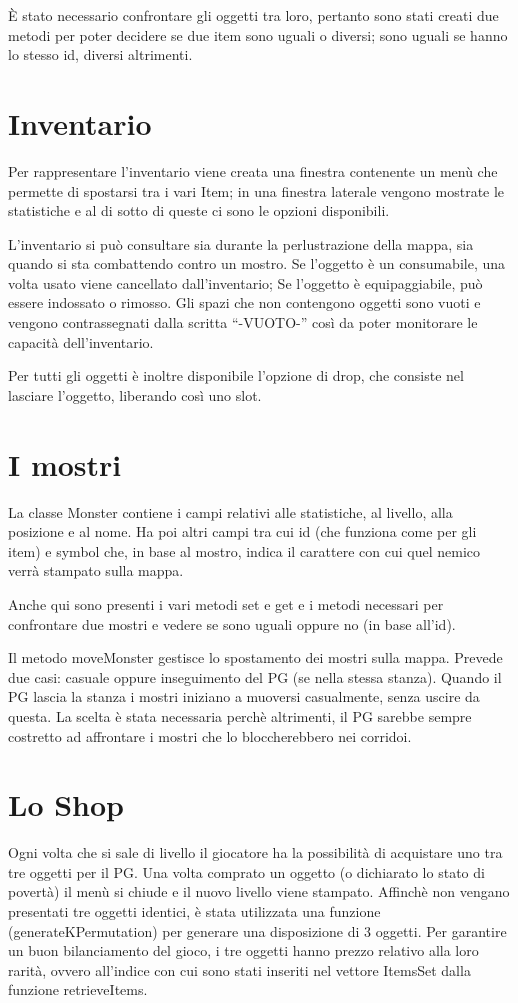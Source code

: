 \documentclass[10pt]{report}
\begin{document}
È stato necessario confrontare gli oggetti tra loro, pertanto sono stati creati due metodi per poter
decidere se due item sono uguali o diversi; sono uguali se hanno lo stesso id, diversi altrimenti.

\section{Inventario}
Per rappresentare l'inventario viene creata una finestra contenente un menù che permette di spostarsi tra i vari Item; in una finestra laterale vengono mostrate le statistiche e al di sotto di queste ci sono le opzioni disponibili.

L'inventario si può consultare sia durante la perlustrazione della mappa, sia quando 
si sta combattendo contro un mostro. 
Se l'oggetto è un consumabile, una volta usato viene cancellato dall'inventario; 
Se l'oggetto è equipaggiabile, può essere indossato o rimosso. Gli spazi che non contengono oggetti sono vuoti e vengono
contrassegnati dalla scritta ``-VUOTO-'' così da poter monitorare le capacità dell'inventario. 

Per tutti gli oggetti è inoltre disponibile l'opzione di drop, che consiste nel lasciare l'oggetto, liberando così uno slot.

\section{I mostri}

La classe Monster contiene i campi relativi alle statistiche, al livello, alla posizione e al nome.
Ha poi altri campi tra cui id (che funziona come per gli item) e symbol che, in base al mostro, indica
il carattere con cui quel nemico verrà stampato sulla mappa.

Anche qui sono presenti i vari metodi set e get e i metodi necessari per confrontare due mostri e vedere
se sono uguali oppure no (in base all'id).

Il metodo moveMonster gestisce lo spostamento dei mostri sulla mappa. Prevede due casi: 
casuale oppure inseguimento del PG (se nella stessa stanza). Quando il PG lascia la stanza i mostri iniziano a muoversi
casualmente, senza uscire da questa. La scelta è stata necessaria perchè altrimenti, 
il PG sarebbe sempre costretto ad affrontare i mostri che lo bloccherebbero nei corridoi.	

\section{Lo Shop}

Ogni volta che si sale di livello il giocatore ha la possibilità di acquistare uno tra tre oggetti per 
il PG. Una volta comprato un oggetto (o dichiarato lo stato di povertà) il menù si chiude e il nuovo livello viene
stampato. Affinchè non vengano presentati tre oggetti identici, è stata utilizzata una funzione (generateKPermutation)
per generare una disposizione di 3 oggetti. Per garantire un buon bilanciamento del gioco, i tre oggetti hanno prezzo
relativo alla loro rarità, ovvero all'indice con cui sono stati inseriti nel vettore ItemsSet dalla funzione
retrieveItems.
\end{document}

